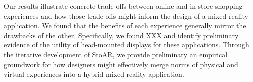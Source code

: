 
Our results illustrate concrete trade-offs between online and in-store shopping experiences and how those trade-offs might inform the design of a mixed reality application. We found that the benefits of each experience generally mirror the drawbacks of the other.  Specifically, we found XXX and identify preliminary evidence of the utility of head-mounted displays for these applications. Through the iterative development of StoAR, we provide preliminary an empirical groundwork for how designers might effectively merge norms of physical and virtual experiences into a hybrid mixed reality application. 



